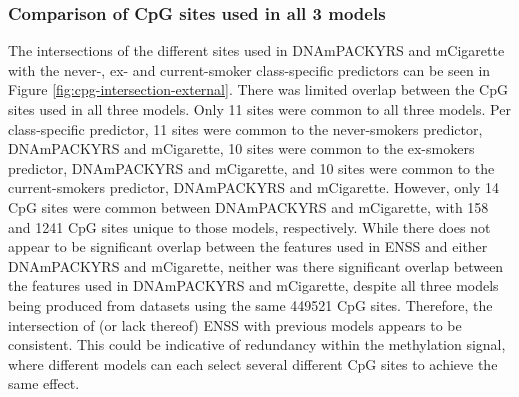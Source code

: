 \documentclass{article} %
\begin{document}

\subsubsection{Comparison of CpG sites used in all 3 models} \label{sec:sites-comparison}

The intersections of the different sites used in DNAmPACKYRS and mCigarette with the never-, ex- and current-smoker class-specific predictors can be seen in Figure \ref{fig:cpg-intersection-external}. There was limited overlap between the CpG sites used in all three models. Only 11 sites were common to all three models. Per class-specific predictor, 11 sites were common to the never-smokers predictor, DNAmPACKYRS and mCigarette, 10 sites were common to the ex-smokers predictor, DNAmPACKYRS and mCigarette, and 10 sites were common to the current-smokers predictor, DNAmPACKYRS and mCigarette. However, only 14 CpG sites were common between DNAmPACKYRS and mCigarette, with 158 and 1241 CpG sites unique to those models, respectively. While there does not appear to be significant overlap between the features used in ENSS and either DNAmPACKYRS and mCigarette, neither was there significant overlap between the features used in DNAmPACKYRS and mCigarette, despite all three models being produced from datasets using the same \num{449521} CpG sites. Therefore, the intersection of (or lack thereof) ENSS with previous models appears to be consistent. This could be indicative of redundancy within the methylation signal, where different models can each select several different CpG sites to achieve the same effect.
\end{document}
